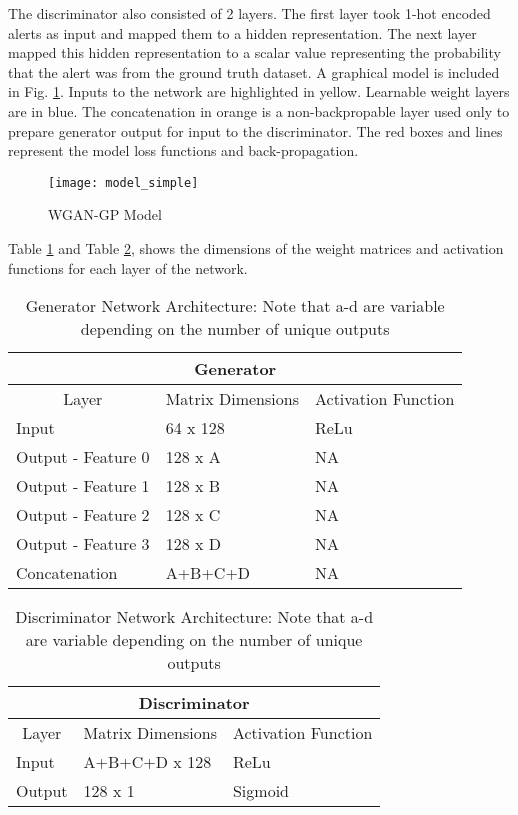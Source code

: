 The discriminator also consisted of 2 layers. The first layer took 1-hot encoded alerts as input and mapped them to a hidden representation. The next layer mapped this hidden representation to a scalar value representing the probability that the alert was from the ground truth dataset. A graphical model is included in Fig. \ref{fig:model_simple}. Inputs to the network are highlighted in yellow. Learnable weight layers are in blue. The concatenation in orange is a non-backpropable layer used only to prepare generator output for input to the discriminator. The red boxes and lines represent the model loss functions and back-propagation.

\begin{figure}[!htbp]
	\centering%
	\texttt{[image: model\_simple]}
	\caption{WGAN-GP Model}
	\label{fig:model_simple}
\end{figure}

Table \ref{tab:model_simple_a} and Table \ref{tab:model_simple_b}, shows the dimensions of the weight matrices and activation functions for each layer of the network.

\begin{table}[!htbp]
	\centering
	\caption{Generator Network Architecture: Note that a-d are variable depending on the number of unique outputs}
	\label{tab:model_simple_a}
	\begin{tabular}{l|l|l}
		\hline
		\multicolumn{3}{c}{\textbf{Generator}} \\ 
		\hline
		\multicolumn{1}{c|}{Layer} & \multicolumn{1}{c|}{Matrix Dimensions} & \multicolumn{1}{c}{Activation Function} \\ \hline
		Input & 64 x 128 & ReLu \\
		Output - Feature 0 & 128 x A & NA \\
		Output - Feature 1 & 128 x B & NA \\
		Output - Feature 2 & 128 x C & NA \\
		Output  - Feature 3 & 128 x D & NA \\
		Concatenation & A+B+C+D & NA \\
		\hline
	\end{tabular}
\end{table}

\begin{table}[!htbp]
	\centering
	\caption{Discriminator Network Architecture: Note that a-d are variable depending on the number of unique outputs}
	\label{tab:model_simple_b}
	\begin{tabular}{l|l|l}
		\hline
		\multicolumn{3}{c}{\textbf{Discriminator}} \\ 
		\hline
		\multicolumn{1}{c|}{Layer} & \multicolumn{1}{c|}{Matrix Dimensions} & \multicolumn{1}{c}{Activation Function} \\ \hline
		Input & A+B+C+D x 128 & ReLu \\
		Output & 128 x 1 & Sigmoid \\
		\hline
	\end{tabular}
\end{table}


